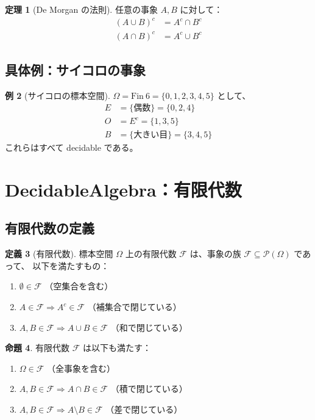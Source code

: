 \documentclass[a4paper,12pt]{ltjsarticle}
\theoremstyle{definition}
\newtheorem{definition}{定義}[section]
\newtheorem{theorem}[definition]{定理}
\newtheorem{proposition}[definition]{命題}
\newtheorem{example}[definition]{例}
\begin{document}
\begin{theorem}[De Morgan の法則]
任意の事象 $A, B$ に対して：
\begin{align*}
(A \cup B)^c &= A^c \cap B^c \\
(A \cap B)^c &= A^c \cup B^c
\end{align*}
\end{theorem}

\subsection{具体例：サイコロの事象}

\begin{example}[サイコロの標本空間]
$\Omega = \text{Fin}\ 6 = \{0, 1, 2, 3, 4, 5\}$ として、
\begin{align*}
E &= \{\text{偶数}\} = \{0, 2, 4\} \\
O &= E^c = \{1, 3, 5\} \\
B &= \{\text{大きい目}\} = \{3, 4, 5\}
\end{align*}
これらはすべて decidable である。
\end{example}

\section{DecidableAlgebra：有限代数}

\subsection{有限代数の定義}

\begin{definition}[有限代数]
標本空間 $\Omega$ 上の有限代数 $\mathcal{F}$ は、事象の族 $\mathcal{F} \subseteq \mathcal{P}(\Omega)$ であって、
以下を満たすもの：
\begin{enumerate}
\item $\emptyset \in \mathcal{F}$ （空集合を含む）
\item $A \in \mathcal{F} \Rightarrow A^c \in \mathcal{F}$ （補集合で閉じている）
\item $A, B \in \mathcal{F} \Rightarrow A \cup B \in \mathcal{F}$ （和で閉じている）
\end{enumerate}
\end{definition}

\begin{proposition}
有限代数 $\mathcal{F}$ は以下も満たす：
\begin{enumerate}
\item $\Omega \in \mathcal{F}$ （全事象を含む）
\item $A, B \in \mathcal{F} \Rightarrow A \cap B \in \mathcal{F}$ （積で閉じている）
\item $A, B \in \mathcal{F} \Rightarrow A \setminus B \in \mathcal{F}$ （差で閉じている）
\end{enumerate}
\end{proposition}
\end{document}
